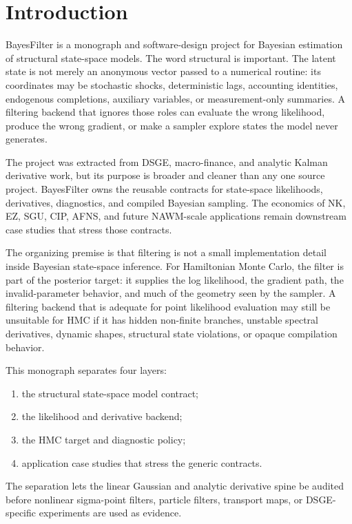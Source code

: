 \chapter{Introduction}
\label{ch:bf-introduction}

BayesFilter is a monograph and software-design project for Bayesian estimation
of structural state-space models.  The word structural is important.  The
latent state is not merely an anonymous vector passed to a numerical routine:
its coordinates may be stochastic shocks, deterministic lags, accounting
identities, endogenous completions, auxiliary variables, or measurement-only
summaries.  A filtering backend that ignores those roles can evaluate the
wrong likelihood, produce the wrong gradient, or make a sampler explore states
the model never generates.

The project was extracted from DSGE, macro-finance, and analytic Kalman
derivative work, but its purpose is broader and cleaner than any one source
project.  BayesFilter owns the reusable contracts for state-space likelihoods,
derivatives, diagnostics, and compiled Bayesian sampling.  The economics of NK,
EZ, SGU, CIP, AFNS, and future NAWM-scale applications remain downstream case
studies that stress those contracts.

The organizing premise is that filtering is not a small implementation detail
inside Bayesian state-space inference.  For Hamiltonian Monte Carlo, the filter
is part of the posterior target: it supplies the log likelihood, the gradient
path, the invalid-parameter behavior, and much of the geometry seen by the
sampler.  A filtering backend that is adequate for point likelihood evaluation
may still be unsuitable for HMC if it has hidden non-finite branches, unstable
spectral derivatives, dynamic shapes, structural state violations, or opaque
compilation behavior.

This monograph separates four layers:
\begin{enumerate}[label=(\roman*)]
  \item the structural state-space model contract;
  \item the likelihood and derivative backend;
  \item the HMC target and diagnostic policy;
  \item application case studies that stress the generic contracts.
\end{enumerate}
The separation lets the linear Gaussian and analytic derivative spine be
audited before nonlinear sigma-point filters, particle filters, transport maps,
or DSGE-specific experiments are used as evidence.

